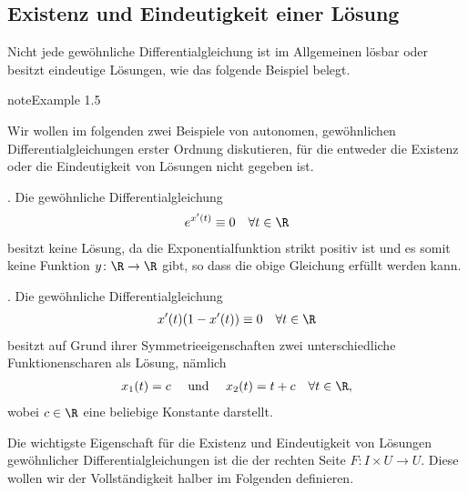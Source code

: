 \documentclass[letterpaper,10pt,english]{jupyterBook}
\begin{document}
\subsection{Existenz und Eindeutigkeit einer Lösung}
\label{\detokenize{ode/repetition:existenz-und-eindeutigkeit-einer-losung}}
\sphinxAtStartPar
Nicht jede gewöhnliche Differentialgleichung ist im Allgemeinen lösbar oder besitzt eindeutige Lösungen, wie das folgende Beispiel belegt.
\label{ode/repetition:example-7}
\begin{sphinxadmonition}{note}{Example 1.5}



\sphinxAtStartPar
Wir wollen im folgenden zwei Beispiele von autonomen, gewöhnlichen Differentialgleichungen erster Ordnung diskutieren, für die entweder die Existenz oder die Eindeutigkeit von Lösungen nicht gegeben ist.

. Die gewöhnliche Differentialgleichung
\begin{equation*}
\begin{split}e^{x'(t)} \equiv 0 \quad \forall t \in \R\end{split}
\end{equation*}
\sphinxAtStartPar
besitzt keine Lösung, da die Exponentialfunktion strikt positiv ist und es somit keine Funktion \(y \colon \R \rightarrow \R\) gibt, so dass die obige Gleichung erfüllt werden kann.

. Die gewöhnliche Differentialgleichung
\begin{equation*}
\begin{split}x'(t)(1-x'(t)) \equiv 0 \quad \forall t \in \R\end{split}
\end{equation*}
\sphinxAtStartPar
besitzt auf Grund ihrer Symmetrieeigenschaften zwei unterschiedliche Funktionenscharen als Lösung, nämlich
\begin{equation*}
\begin{split}x_1(t) = c \quad \text{ und } \quad x_2(t) = t + c \quad \forall t \in \R,\end{split}
\end{equation*}
\sphinxAtStartPar
wobei \(c \in \R\) eine beliebige Konstante darstellt.
\end{sphinxadmonition}

\sphinxAtStartPar
Die wichtigste Eigenschaft für die Existenz und Eindeutigkeit von Lösungen gewöhnlicher Differentialgleichungen ist die  der rechten Seite \(F \colon I \times U \rightarrow U\).
Diese wollen wir der Vollständigkeit halber im Folgenden definieren.
\end{document}
